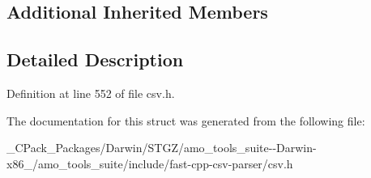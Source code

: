 \subsection*{Additional Inherited Members}


\subsection{Detailed Description}


Definition at line 552 of file csv.\+h.



The documentation for this struct was generated from the following file\+:\begin{DoxyCompactItemize}
\item 
\+\_\+\+C\+Pack\+\_\+\+Packages/\+Darwin/\+S\+T\+G\+Z/amo\+\_\+tools\+\_\+suite-\/-\/\+Darwin-\/x86\+\_/amo\+\_\+tools\+\_\+suite/include/fast-\/cpp-\/csv-\/parser/csv.\+h\end{DoxyCompactItemize}
